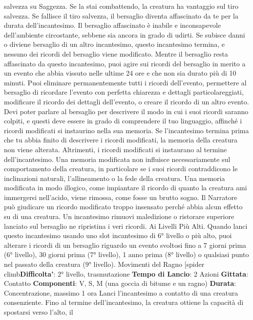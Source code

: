 \begin{multicols}{2}
salvezza su Saggezza. Se la stai combattendo, la
creatura ha vantaggio sul tiro salvezza. Se fallisce il tiro
salvezza, il bersaglio diventa affascinato da te per la
durata dell’incantesimo. Il bersaglio affascinato è inabile
e inconsapevole dell’ambiente circostante, sebbene sia
ancora in grado di udirti. Se subisce danni o diviene
bersaglio di un altro incantesimo, questo incantesimo 
termina, e nessuno dei ricordi del bersaglio viene
modificato.
Mentre il bersaglio resta affascinato da questo
incantesimo, puoi agire sui ricordi del bersaglio in
merito a un evento che abbia vissuto nelle ultime 24 ore
e che non sia durato più di 10 minuti. Puoi eliminare
permanentemente tutti i ricordi dell’evento, permettere
al bersaglio di ricordare l’evento con perfetta chiarezza
e dettagli particolareggiati, modificare il ricordo dei
dettagli dell’evento, o creare il ricordo di un altro evento.
Devi poter parlare al bersaglio per descrivere il modo in
cui i suoi ricordi saranno colpiti, e questi deve essere in
grado di comprendere il tuo linguaggio, affinché i ricordi
modificati si instaurino nella sua memoria. Se
l’incantesimo termina prima che tu abbia finito di
descrivere i ricordi modificati, la memoria della creatura
non viene alterata. Altrimenti, i ricordi modificati si
instaurano al termine dell’incantesimo.
Una memoria modificata non influisce necessariamente
sul comportamento della creatura, in particolare se i
suoi ricordi contraddicono le inclinazioni naturali,
l’allineamento o la fede della creatura. Una memoria
modificata in modo illogico, come impiantare il ricordo di
quanto la creatura ami immergersi nell’acido, viene
rimossa, come fosse un brutto sogno. Il Narratore può
giudicare un ricordo modificato troppo insensato perché
abbia alcun effetto su di una creatura.
Un incantesimo rimuovi maledizione o ristorare
superiore lanciato sul bersaglio ne ripristina i veri
ricordi.
Ai Livelli Più Alti. Quando lanci questo incantesimo
usando uno slot incantesimo di 6° livello o più alto, puoi
alterare i ricordi di un bersaglio riguardo un evento
svoltosi fino a 7 giorni prima (6° livello), 30 giorni prima
(7° livello), 1 anno prima (8° livello) o qualsiasi punto
nel passato della creatura (9° livello).
Movimenti del Ragno
[spider climb\textbf{Difficolta'}:
2° livello, trasmutazione
\textbf{Tempo di Lancio}: 2 Azioni
\textbf{Gittata}: Contatto
\textbf{Componenti}: V, S, M (una goccia di bitume e un
ragno)
\textbf{Durata}: Concentrazione, massimo 1 ora
Lanci l’incantesimo a contatto di una creatura
consenziente. Fino al termine dell’incantesimo, la
creatura ottiene la capacità di spostarsi verso l’alto, il

\end{multicols}
